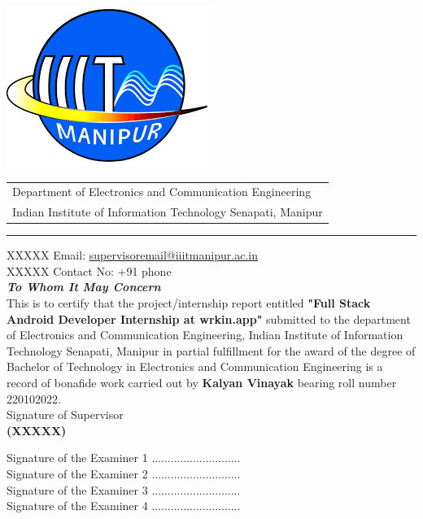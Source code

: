 \documentclass[a4paper, 11pt, oneside]{report}
\begin{document}
\begin{center}
\thispagestyle{empty}
\begin{table}[h]
\centering
\includegraphics[scale=0.2]{report_file/iiit manipur.png}
    \begin{tabular}{l}
Department of Electronics and Communication Engineering \\
Indian Institute of Information Technology Senapati, Manipur \\
\end{tabular}
\end{table}
\par\noindent\rule{\textwidth}{0.4pt}
XXXXX \hspace*{\fill} Email: \href{mailto:supervisoremail@iiitmanipur.ac.in}{supervisoremail@iiitmanipur.ac.in} \\
XXXXX \hspace*{0pt}\hfill Contact No: +91 phone\\[2cm]

{\Huge \textbf{\emph{To Whom It May Concern}}}\\[2cm]
\linespread{1.13}
\large{This is to certify that the project/internship report entitled \textbf{"Full Stack Android Developer Internship at wrkin.app"} submitted to the department of Electronics and Communication Engineering, Indian Institute of Information Technology Senapati, Manipur in partial fulfillment for the award of the degree of Bachelor of Technology in Electronics and Communication Engineering is a record of bonafide work carried out by \textbf{Kalyan Vinayak} bearing roll number 220102022.}\\[2cm]

\hspace*{2.6in} \large{Signature of Supervisor} \\[0.3cm]
\hspace*{2.5in} \textbf{(XXXXX)} \\[0.5cm]
\end{center}

\vspace{0.5cm}
Signature of the Examiner 1 ............................\\
Signature of the Examiner 2 ............................\\
Signature of the Examiner 3 ............................\\
Signature of the Examiner 4 ............................\\
\end{document}
